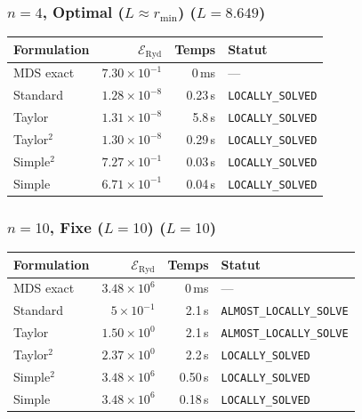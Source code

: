 \subsubsection{$n=4$, Optimal ($L{\approx}r_{\min}$) ($L=8.649$)}
\begin{longtable}{@{}lrrl@{}}
  \toprule
  Formulation & $\mathcal{E}_{\mathrm{Ryd}}$ & Temps & Statut \\
  \midrule
  \endhead
  MDS exact & $7.30\times10^{-1}$ & 0\,ms & --- \\
  Standard & $1.28\times10^{-8}$ & 0.23\,s & \texttt{LOCALLY\_SOLVED} \\
  Taylor & $1.31\times10^{-8}$ & 5.8\,s & \texttt{LOCALLY\_SOLVED} \\
  Taylor$^2$ & $1.30\times10^{-8}$ & 0.29\,s & \texttt{LOCALLY\_SOLVED} \\
  Simple$^2$ & $7.27\times10^{-1}$ & 0.03\,s & \texttt{LOCALLY\_SOLVED} \\
  Simple & $6.71\times10^{-1}$ & 0.04\,s & \texttt{LOCALLY\_SOLVED} \\
  \bottomrule
\end{longtable}

\subsubsection{$n=10$, Fixe ($L{=}10$) ($L=10$)}
\begin{longtable}{@{}lrrl@{}}
  \toprule
  Formulation & $\mathcal{E}_{\mathrm{Ryd}}$ & Temps & Statut \\
  \midrule
  \endhead
  MDS exact & $3.48\times10^{6}$ & 0\,ms & --- \\
  Standard & $5\times10^{-1}$ & 2.1\,s & \texttt{ALMOST\_LOCALLY\_SOLVE} \\
  Taylor & $1.50\times10^{0}$ & 2.1\,s & \texttt{ALMOST\_LOCALLY\_SOLVE} \\
  Taylor$^2$ & $2.37\times10^{0}$ & 2.2\,s & \texttt{LOCALLY\_SOLVED} \\
  Simple$^2$ & $3.48\times10^{6}$ & 0.50\,s & \texttt{LOCALLY\_SOLVED} \\
  Simple & $3.48\times10^{6}$ & 0.18\,s & \texttt{LOCALLY\_SOLVED} \\
  \bottomrule
\end{longtable}

